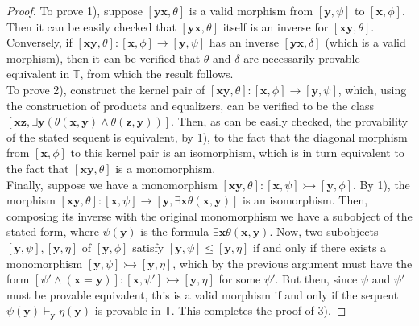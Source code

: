 \documentclass[a4paper,11pt]{article}
\theoremstyle{plain}
\theoremstyle{plain}
\theoremstyle{remark}
\newcommand{\theory}{\ensuremath{\mathbb{T}}}
\begin{document}
\begin{proof} To prove 1), suppose $[\mathbf{y}\mathbf{x}, \theta]$ is a valid morphism from $[\mathbf{y}, \psi]$ to $[\mathbf{x}, \phi]$. Then it can be easily checked that $[\mathbf{y}\mathbf{x}, \theta]$ itself is an inverse for $[\mathbf{x}\mathbf{y}, \theta]$. Conversely, if $[\mathbf{x}\mathbf{y}, \theta]: [\mathbf{x}, \phi] \rightarrow [\mathbf{y}, \psi]$ has an inverse $[\mathbf{y}\mathbf{x}, \delta]$ (which is a valid morphism), then it can be verified that $\theta$ and $\delta$ are necessarily provable equivalent in $\theory$, from which the result follows.\\

To prove 2), construct the kernel pair of $[\mathbf{x}\mathbf{y}, \theta]: [\mathbf{x}, \phi] \rightarrow [\mathbf{y}, \psi]$, which,  using the construction of products and equalizers, can be verified to be the class $[\mathbf{x}\mathbf{z}, \exists \mathbf{y} (\theta(\mathbf{x}, \mathbf{y}) \wedge \theta(\mathbf{z}, \mathbf{y}))]$. Then, as can be easily checked, the provability of the stated sequent is equivalent, by 1), to the fact that the diagonal morphism from $[\mathbf{x}, \phi]$ to this kernel pair is an isomorphism, which is in turn equivalent to the fact that $[\mathbf{x}\mathbf{y}, \theta]$ is a monomorphism.\\

Finally, suppose we have a monomorphism $[\mathbf{x}\mathbf{y}, \theta]: [\mathbf{x}, \psi] \rightarrowtail [\mathbf{y}, \phi]$. By 1), the morphism $[\mathbf{x}\mathbf{y}, \theta]: [\mathbf{x}, \psi] \rightarrow [\mathbf{y}, \exists \mathbf{x} \theta(\mathbf{x}, \mathbf{y})]$ is an isomorphism. Then, composing its inverse with the original monomorphism we have a subobject of the stated form, where $\psi(\mathbf{y})$ is the formula $\exists \mathbf{x} \theta(\mathbf{x}, \mathbf{y})$. Now, two subobjects $[\mathbf{y}, \psi], [\mathbf{y}, \eta]$ of $[\mathbf{y}, \phi]$ satisfy $[\mathbf{y}, \psi] \leq [\mathbf{y}, \eta]$ if and only if there exists a monomorphism $[\mathbf{y}, \psi] \rightarrowtail [\mathbf{y}, \eta]$, which by the previous argument must have the form $[\psi' \wedge (\mathbf{x}=\mathbf{y})]: [\mathbf{x}, \psi'] \rightarrowtail [\mathbf{y}, \eta]$ for some $\psi'$. But then, since $\psi$ and $\psi'$ must be  provable equivalent, this is a valid morphism if and only if the sequent $\psi(\mathbf{y}) \vdash_{\mathbf{y}} \eta(\mathbf{y})$ is provable in $\theory$. This completes the proof of 3).\end{proof}
\end{document}
